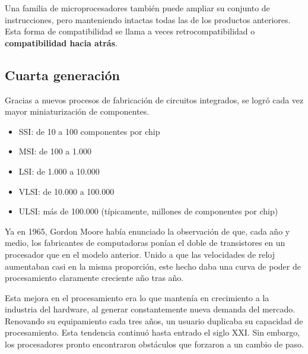 \documentclass[spanish,a4paper,]{article}
\providecommand{\tightlist}{%
  \setlength{\itemsep}{0pt}\setlength{\parskip}{0pt}}
\begin{document}
Una familia de microprocesadores también puede ampliar su conjunto de
instrucciones, pero manteniendo intactas todas las de los productos
anteriores. Esta forma de compatibilidad se llama a veces
retrocompatibilidad o \textbf{compatibilidad hacia atrás}.

\hypertarget{cuarta-generaciuxf3n}{%
\subsection{Cuarta generación}\label{cuarta-generaciuxf3n}}

Gracias a nuevos procesos de fabricación de circuitos integrados, se
logró cada vez mayor miniaturización de componentes.

\begin{itemize}
\tightlist
\item
  SSI: de 10 a 100 componentes por chip
\item
  MSI: de 100 a 1.000
\item
  LSI: de 1.000 a 10.000
\item
  VLSI: de 10.000 a 100.000
\item
  ULSI: más de 100.000 (típicamente, millones de componentes por chip)
\end{itemize}

Ya en 1965, Gordon Moore había enunciado la observación de que, cada año
y medio, los fabricantes de computadoras ponían el doble de transistores
en un procesador que en el modelo anterior. Unido a que las velocidades
de reloj aumentaban casi en la misma proporción, este hecho daba una
curva de poder de procesamiento claramente creciente año tras año.

Esta mejora en el procesamiento era lo que mantenía en crecimiento a la
industria del hardware, al generar constantemente nueva demanda del
mercado. Renovando su equipamiento cada tres años, un usuario duplicaba
su capacidad de procesamiento. Esta tendencia continuó hasta entrado el
siglo XXI. Sin embargo, los procesadores pronto encontraron obstáculos
que forzaron a un cambio de paso.
\end{document}
